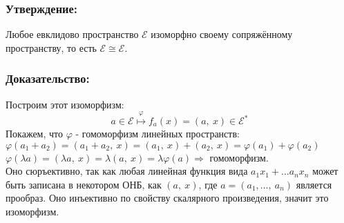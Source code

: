\documentclass[12pt, letterpaper, twoside]{article}
\begin{document}
\subsubsection*{Утверждение:}
    Любое евклидово пространство $\mathcal{E}$ изоморфно своему сопряжённому пространству, то есть $\mathcal{E} \cong \mathcal{E}$.
\subsubsection*{Доказательство:}
    Построим этот изоморфизм:
\[a\in \mathcal{E} \overset{\varphi}{\longmapsto} f_a(x) = (a,\ x)\in \mathcal{E}^*\]
    Покажем, что $\varphi$ - гомоморфизм линейных пространств:\\
    $\varphi(a_1 + a_2) = (a_1 + a_2,\ x) = (a_1,\ x) + (a_2,\ x) = \varphi(a_1) + \varphi(a_2)$\\
    $\varphi(\lambda a) = (\lambda a,\ x) = \lambda (a,\ x) = \lambda \varphi (a)\Rightarrow$ гомоморфизм.\\
    Оно сюръективно, так как любая линейная функция вида $a_1x_1 + \dots a_n x_n$ может быть записана в некотором ОНБ, как $(a,\ x)$, где $a = (a_1,\dots,\ a_n)$ является прообраз. Оно инъективно по свойству скалярного произведения, значит это изоморфизм.
\end{document}
